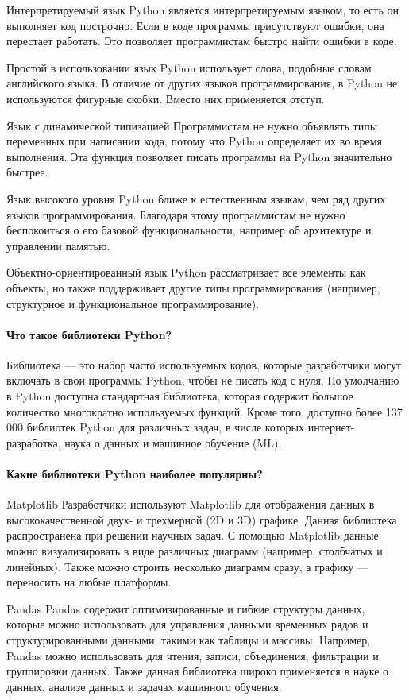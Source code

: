 Интерпретируемый язык
Python является интерпретируемым языком, то есть он выполняет код построчно. Если в коде программы присутствуют ошибки, она перестает работать. Это позволяет программистам быстро найти ошибки в коде.

Простой в использовании язык
Python использует слова, подобные словам английского языка. В отличие от других языков программирования, в Python не используются фигурные скобки. Вместо них применяется отступ. 

Язык с динамической типизацией
Программистам не нужно объявлять типы переменных при написании кода, потому что Python определяет их во время выполнения. Эта функция позволяет писать программы на Python значительно быстрее.

Язык высокого уровня
Python ближе к естественным языкам, чем ряд других языков программирования. Благодаря этому программистам не нужно беспокоиться о его базовой функциональности, например об архитектуре и управлении памятью.

Объектно-ориентированный язык
Python рассматривает все элементы как объекты, но также поддерживает другие типы программирования (например, структурное и функциональное программирование).

\paragraph{Что такое библиотеки Python?}
Библиотека — это набор часто используемых кодов, которые разработчики могут включать в свои программы Python, чтобы не писать код с нуля. По умолчанию в Python доступна стандартная библиотека, которая содержит большое количество многократно используемых функций. Кроме того, доступно более 137 000 библиотек Python для различных задач, в числе которых интернет-разработка, наука о данных и машинное обучение (ML).

\paragraph{Какие библиотеки Python наиболее популярны?}
Matplotlib
Разработчики используют Matplotlib для отображения данных в высококачественной двух- и трехмерной (2D и 3D) графике. Данная библиотека распространена при решении научных задач. С помощью Matplotlib данные можно визуализировать в виде различных диаграмм (например, столбчатых и линейных). Также можно строить несколько диаграмм сразу, а графику — переносить на любые платформы.

Pandas
Pandas содержит оптимизированные и гибкие структуры данных, которые можно использовать для управления данными временных рядов и структурированными данными, такими как таблицы и массивы. Например, Pandas можно использовать для чтения, записи, объединения, фильтрации и группировки данных. Также данная библиотека широко применяется в науке о данных, анализе данных и задачах машинного обучения.

